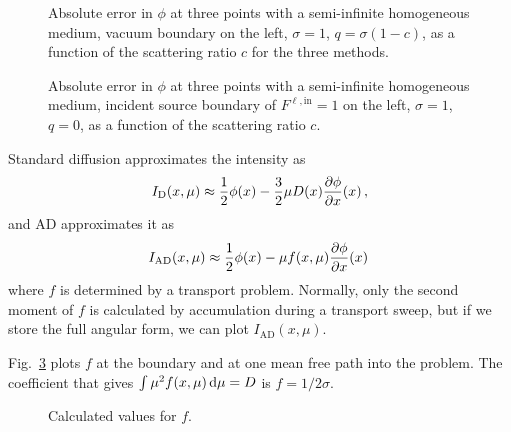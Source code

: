 \begin{figure}[htb]
  \centering
  
  \caption{Absolute error in $\phi$ at three points with a semi-infinite
  homogeneous medium, vacuum boundary on the left, $\sigma=1$,
  $q=\sigma(1-c)$, as a function of the scattering ratio $c$ for the three
  methods.}
  \label{fig:bndycondHomogC}
\end{figure}

\begin{figure}[htb]
  \centering
  
  \caption{Absolute error in $\phi$ at three points with a semi-infinite
  homogeneous medium, incident source
  boundary of $F^{\ell,\mathrm{in}}=1$ on the left, $\sigma=1$, $q=0$, as a
  function of the scattering ratio $c$.}
  \label{fig:bndycondHomogC}
\end{figure}
%
%  

Standard diffusion approximates the intensity as
\begin{equation*}
  I_\mathrm{D}(x, \mu) \approx \frac{1}{2} \phi(x) - \frac{3}{2} \mu D(x) \frac{\partial \phi}{\partial x}(x)\,,
\end{equation*}
and AD approximates it as
\begin{equation*}
  I_\mathrm{AD}(x, \mu) \approx \frac{1}{2} \phi(x) - \mu f(x, \mu)
  \frac{\partial \phi}{\partial x}(x)\,
\end{equation*}
where $f$ is determined by a transport problem. Normally, only the second
moment of $f$ is calculated by accumulation during a transport sweep, but if we
store the full angular form, we can plot $I_\mathrm{AD}(x, \mu)$.

Fig.~\ref{fig:bndycondAdfOut} plots $f$ at the boundary and at one mean free
path into the problem. The coefficient that gives $\int \mu^2 f(x,\mu) \mathop{}\!\mathrm{d} \mu
=D $ is $f=1/2\sigma$.

\begin{figure}[htb]
  \centering
  \hspace{-.6in}
  \subfigure[$x=0.00125$]{
  
  }
  \hspace{-.2in}
  \subfigure[$x=1$]{
  
  }
  \hspace{-.6in}
  \caption{Calculated values for $f$.}
  \label{fig:bndycondAdfOut}
\end{figure}


